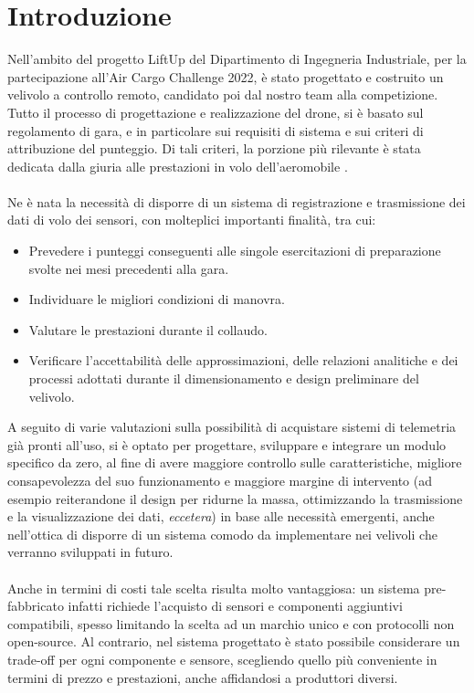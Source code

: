 \documentclass[12pt]{article}
\begin{document}
\newpage
\tableofcontents
\newpage

\section{Introduzione} 
Nell'ambito del progetto LiftUp del Dipartimento di Ingegneria Industriale, per la partecipazione all'Air Cargo Challenge 2022, è stato progettato e costruito un velivolo a controllo remoto, candidato poi dal nostro team alla competizione.
Tutto il processo di progettazione e realizzazione del drone, si è basato sul regolamento di gara, e in particolare sui requisiti di sistema e sui criteri di attribuzione del punteggio. Di tali criteri, la porzione più rilevante è stata dedicata dalla giuria alle prestazioni in volo dell'aeromobile \cite{regulation}. 
\\\\
Ne è nata la necessità di disporre di un sistema di registrazione e trasmissione dei dati di volo dei sensori, con molteplici importanti finalità, tra cui: 

\begin{itemize}
\item Prevedere i punteggi conseguenti alle singole esercitazioni di preparazione svolte nei mesi precedenti alla gara.
\item Individuare le migliori condizioni di manovra.
\item Valutare le prestazioni durante il collaudo.
\item Verificare l'accettabilità delle approssimazioni, delle relazioni analitiche e dei processi adottati durante il dimensionamento e design preliminare del velivolo.
\end{itemize}

\noindent
A seguito di varie valutazioni sulla possibilità di acquistare sistemi di telemetria già pronti all'uso, si è optato per progettare, sviluppare e integrare un modulo specifico da zero, al fine di avere maggiore controllo sulle caratteristiche, migliore consapevolezza del suo funzionamento e maggiore margine di intervento (ad esempio reiterandone il design per ridurne la massa, ottimizzando la trasmissione e la visualizzazione dei dati, \textit{eccetera}) in base alle necessità emergenti, anche nell'ottica di disporre di un sistema comodo da implementare nei velivoli che verranno sviluppati in futuro.
\\\\
Anche in termini di costi tale scelta risulta molto vantaggiosa: un sistema pre-fabbricato infatti richiede l'acquisto di sensori e componenti aggiuntivi compatibili, spesso limitando la scelta ad un marchio unico e con protocolli non open-source. Al contrario, nel sistema progettato è stato possibile considerare un trade-off per ogni componente e sensore, scegliendo quello più conveniente in termini di prezzo e prestazioni, anche affidandosi a produttori diversi. 
\end{document}
